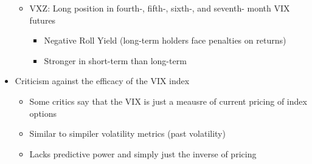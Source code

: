\documentclass{article}
\begin{document}
\begin{itemize}
\begin{itemize}
\begin{itemize}
        \end{itemize}
        \item VXZ: Long position in fourth-, fifth-, sixth-, and seventh- month VIX futures
        \begin{itemize}
            \item Negative Roll Yield (long-term holders face penalties on returns)
            \item Stronger in short-term than long-term
        \end{itemize}
    \end{itemize}
    \item Criticism against the efficacy of the VIX index
    \begin{itemize}
        \item Some critics say that the VIX is just a meausre of current pricing of index options
        \item Similar to simpiler volatility metrics (past volatility)
        \item Lacks predictive power and simply just the inverse of pricing
    \end{itemize}

\end{itemize}

    
\end{document}
